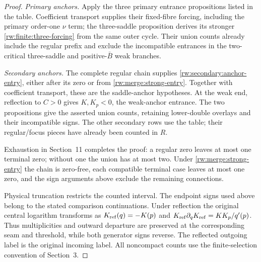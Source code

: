 \begin{proof}
\emph{Primary anchors.}
Apply the three primary entrance propositions listed in the table.
Coefficient transport supplies their fixed-fibre forcing, including
the primary order-one $\nu$ term; the three-saddle proposition derives
its stronger \eqref{rw:finite:three-forcing} from the same outer cycle.
Their union counts already include the regular prefix and exclude
the incompatible entrances in the two-critical three-saddle and
positive-$\bar B$ weak branches.

\emph{Secondary anchors.}
The complete regular chain supplies
\eqref{rw:secondary:anchor-entry}, either after its zero or from
\eqref{rw:merge:strong-entry}. Together with coefficient transport,
these are the saddle-anchor hypotheses. At the weak end, reflection
to $C>0$ gives $K,K_p<0$, the weak-anchor entrance. The two
propositions give the asserted union counts, retaining lower-double
overlays and their incompatible signs. The other secondary rows use
the table; their regular/focus pieces have already been counted in $R$.

Exhaustion in Section~11 completes the proof: a regular zero leaves
at most one terminal zero; without one the union has at most two.
Under \eqref{rw:merge:strong-entry} the chain is zero-free, each
compatible terminal case leaves at most one zero, and the sign
arguments above exclude the remaining connections.

Physical truncation restricts the counted interval. The endpoint
signs used above belong to the stated comparison continuations.
Under reflection the original central logarithm transforms as
$K_{\rm ref}(q)=-K(p)$ and
$K_{\rm ref}\partial_qK_{\rm ref}=KK_p/q'(p)$.
Thus multiplicities and outward departure are preserved at the
corresponding seam and threshold, while both generator signs reverse.
The reflected outgoing label is the original incoming label.
All noncompact counts use the finite-selection convention of Section~3.
\end{proof}
